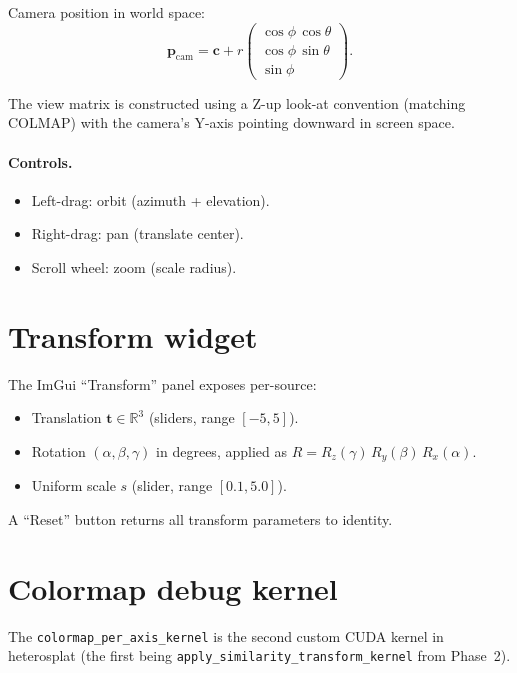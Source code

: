 \documentclass[11pt]{article}
\newcommand{\R}{\mathbb{R}}
\begin{document}
Camera position in world space:
\begin{equation}
  \mathbf{p}_\text{cam} = \mathbf{c} +
  r \begin{pmatrix}
    \cos\phi\,\cos\theta \\
    \cos\phi\,\sin\theta \\
    \sin\phi
  \end{pmatrix}.
\end{equation}

The view matrix is constructed using a Z-up look-at convention
(matching COLMAP) with the camera's Y-axis pointing downward in screen
space.

\paragraph{Controls.}
\begin{itemize}
  \item Left-drag: orbit (azimuth + elevation).
  \item Right-drag: pan (translate center).
  \item Scroll wheel: zoom (scale radius).
\end{itemize}

\section{Transform widget}

The ImGui ``Transform'' panel exposes per-source:
\begin{itemize}
  \item Translation $\mathbf{t} \in \R^3$ (sliders, range $[-5, 5]$).
  \item Rotation $(\alpha, \beta, \gamma)$ in degrees, applied as
        $R = R_z(\gamma)\,R_y(\beta)\,R_x(\alpha)$.
  \item Uniform scale $s$ (slider, range $[0.1, 5.0]$).
\end{itemize}

A ``Reset'' button returns all transform parameters to identity.

\section{Colormap debug kernel}
\label{sec:colormap}

The \texttt{colormap\_per\_axis\_kernel} is the second custom CUDA kernel
in heterosplat (the first being \texttt{apply\_similarity\_transform\_kernel}
from Phase~2).
\end{document}

